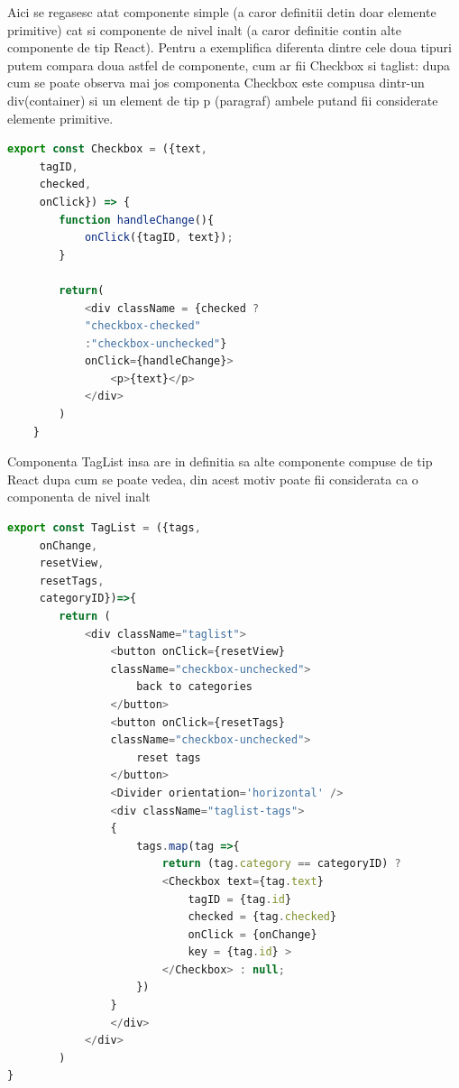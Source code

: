 \documentclass[12pt,a4paper,hidelinks]{report}
\theoremstyle{definition}
\theoremstyle{remark}
\begin{document}
\begin{itemize}
    Aici se regasesc atat componente simple (a caror definitii detin doar elemente primitive) cat si componente de nivel inalt 
    (a caror definitie contin alte componente de tip React). 
    Pentru a exemplifica diferenta dintre cele doua tipuri putem compara doua astfel de componente, cum ar fii Checkbox si taglist:
    dupa cum se poate observa mai jos componenta Checkbox este compusa dintr-un div(container) si un element de tip p (paragraf)
    ambele putand fii considerate elemente primitive.
    \begin{lstlisting}[language=Javascript]
    export const Checkbox = ({text,
     tagID,
     checked,
     onClick}) => {
        function handleChange(){
            onClick({tagID, text});
        }

        return(
            <div className = {checked ?
            "checkbox-checked"
            :"checkbox-unchecked"}
            onClick={handleChange}>
                <p>{text}</p>
            </div>
        )
    }
    \end{lstlisting}
    Componenta TagList insa are in definitia sa alte componente compuse de tip React dupa cum se poate vedea, 
    din acest motiv poate fii considerata ca o componenta de nivel inalt
    \begin{lstlisting}[language=Javascript]
    export const TagList = ({tags,
     onChange,
     resetView,
     resetTags,
     categoryID})=>{
        return (
            <div className="taglist">
                <button onClick={resetView}
                className="checkbox-unchecked">
                    back to categories
                </button>
                <button onClick={resetTags}
                className="checkbox-unchecked">
                    reset tags
                </button>
                <Divider orientation='horizontal' />
                <div className="taglist-tags">
                {
                    tags.map(tag =>{
                        return (tag.category == categoryID) ?
                        <Checkbox text={tag.text}
                            tagID = {tag.id}
                            checked = {tag.checked}
                            onClick = {onChange}
                            key = {tag.id} >
                        </Checkbox> : null;
                    }) 
                }
                </div>
            </div>
        )
}
    \end{lstlisting}
\end{itemize}
\end{document}
